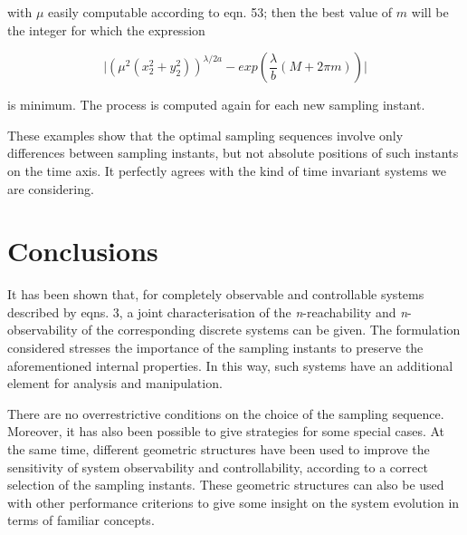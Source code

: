 \documentclass{article}
\begin{document}
with $\mu$ easily computable according to eqn. 53; then
the best value of $m$ will be the integer for which the expression

\begin{equation}\label{eq:61}
\Big| (\mu^2(x_2^2 + y_2^2))^{\lambda / 2a} - exp(\frac{\lambda}{b}(M + 2\pi m))\Big|
\end{equation}

is minimum. The process is computed again for each
new sampling instant.

These examples show that the optimal
sampling sequences involve only differences between sampling
instants, but not absolute positions of such instants on the time
axis. It perfectly agrees with the kind of time invariant systems
we are considering.

\section{Conclusions}
It has been shown that, for completely observable and controllable
systems described by eqns. 3, a joint characterisation of the
\textit{n}-reachability and \textit{n}-observability of the
corresponding discrete systems can be given. The formulation
considered stresses the importance of the sampling instants to
preserve the aforementioned internal properties. In this way, such
systems have an additional element for analysis and manipulation.

There are no overrestrictive conditions on the choice of the
sampling sequence. Moreover, it has also been possible to give
strategies for some special cases. At the same time, different
geometric structures have been used to improve the sensitivity of
system observability and controllability, according to a correct
selection of the sampling instants. These geometric structures can
also be used with other performance criterions to give some
insight on the system evolution in terms of familiar concepts.
\end{document}

